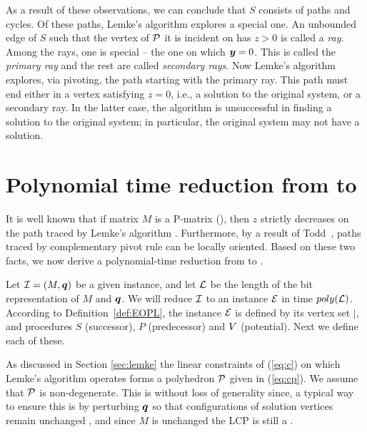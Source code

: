 As a result of these observations, we can conclude that $S$ consists of paths and cycles.  Of these paths, Lemke's algorithm
explores a special one.  An unbounded edge of $S$ such that the vertex of $\mbox{${\mathcal P}$}$ it is incident on has $z > 0$ is called a
{\em ray}.  Among the rays, one is special -- the one on which $\mbox{\boldmath $y$} = 0$. This is called the {\em primary ray} and the rest
are called {\em secondary rays}. Now Lemke's algorithm explores, via pivoting, the path starting with the primary ray. This
path must end either in a vertex satisfying $z = 0$, i.e., a solution to the original system, or a secondary ray. In the
latter case, the algorithm is unsuccessful in finding a solution to the original system; in particular, the original system
may not have a solution.  

\section{Polynomial time reduction from \PLCP to \EOPL}

It is well known that if matrix $M$ is a P-matrix (\PLCP), then $z$ strictly
decreases on the path traced by Lemke's algorithm \cite{cottle2009linear}.
Furthermore, by a result of Todd~\cite[Section 5]{todd1976orientation}, paths traced by
complementary pivot rule can be locally oriented.  Based on these two facts, 
we now derive a polynomial-time reduction from \PLCP to \EOPL.

Let $\mbox{${\mathcal I}$}=(M,\mbox{\boldmath $q$})$ be a given \PLCP instance, and let $\mbox{${\mathcal L}$}$ be the length of the 
bit representation of $M$ and $\mbox{\boldmath $q$}$. 
We will reduce $\mbox{${\mathcal I}$}$ to an \EOPL instance $\mbox{${\mathcal E}$}$ in time $poly(\mbox{${\mathcal L}$})$. 
According to Definition~\ref{def:EOPL}, the instance $\mbox{${\mathcal E}$}$ is defined 
by its vertex set $\vert$, and procedures $S$ (successor), $P$ (predecessor) and $\mbox{$V$}$ (potential). 
Next we define each of these. 

As discussed in Section \ref{sec:lemke} the linear constraints of (\ref{eq:c})
on which Lemke's algorithm operates forms a polyhedron $\mbox{${\mathcal P}$}$ given in
(\ref{eq:cp}). We assume that $\mbox{${\mathcal P}$}$ is non-degenerate. This is without
loss of generality since, a typical way to ensure this is by perturbing $\mbox{\boldmath $q$}$ so
that configurations of solution vertices remain unchanged
\cite{cottle2009linear}, and since $M$ is unchanged the LCP is still a \PLCP. 

